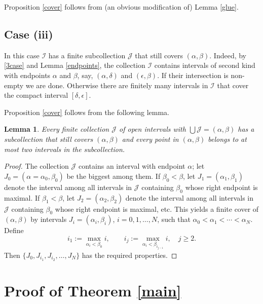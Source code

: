 \documentclass[12pt]{amsart}
\theoremstyle{plain}
\newtheorem{lemma}{Lemma}
\theoremstyle{definition}
\numberwithin{equation}{section}
\begin{document}
  Proposition \ref{cover} follows from (an obvious modification of) Lemma \ref{glue}.

  \subsection*{Case (iii)}
  In this case ${\mathcal{I}}$ has a finite subcollection ${\mathcal{J}}$ that still covers $({\alpha},{\beta})$. Indeed,
  by \eqref{3case} and Lemma \ref{endpoints}, the collection ${\mathcal{I}}$ contains intervals of second kind with endpoints ${\alpha}$ and ${\beta}$, 
  say, $({\alpha},{\delta})$ and $({\epsilon},{\beta})$. If their intersection is non-empty we are done. Otherwise there are finitely many   
  intervals in ${\mathcal{I}}$ that cover the compact interval $[{\delta},{\epsilon}]$.

  Proposition \ref{cover} follows from the following lemma.  

  \begin{lemma}
    Every finite collection ${\mathcal{J}}$ of open intervals with $\bigcup {\mathcal{J}} = ({\alpha},{\beta})$ 
    has a subcollection that still covers $({\alpha},{\beta})$ and every point in $({\alpha},{\beta})$ belongs to at most two 
    intervals in the subcollection.  
  \end{lemma}

  \begin{proof}
    The collection ${\mathcal{J}}$ contains an interval with endpoint ${\alpha}$; let $J_0 = ({\alpha} = {\alpha}_0,{\beta}_0)$ be the biggest among them. 
    If ${\beta}_0 < {\beta}$,
    let $J_1 = ({\alpha}_1,{\beta}_1)$ denote the interval among all intervals in ${\mathcal{J}}$ containing ${\beta}_0$ whose right endpoint is maximal.
    If ${\beta}_1 < {\beta}$,
    let $J_2 = ({\alpha}_2,{\beta}_2)$ denote the interval among all intervals in ${\mathcal{J}}$ containing ${\beta}_0$ whose right endpoint is maximal, etc. 
    This yields a finite cover of $({\alpha},{\beta})$ by intervals $J_i = ({\alpha}_i,{\beta}_i)$, $i = 0,1,\ldots,N$, such that ${\alpha}_0 < {\alpha}_1 < \cdots < {\alpha}_N$.
    Define 
    \[
      i_1 := \max_{{\alpha}_i <{\beta}_0} i, \qquad i_j := \max_{{\alpha}_i <{\beta}_{i_{j-1}}} i,  \quad j \ge 2.  
    \]
    Then $\{J_0,J_{i_1},J_{i_2},\ldots,J_N\}$ has the required properties.
  \end{proof}

\section{Proof of Theorem \ref{main}} \label{proof}
\end{document}
